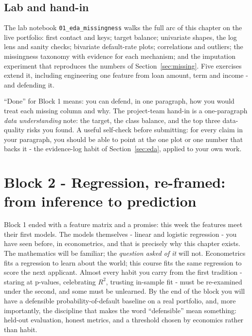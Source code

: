 \documentclass[11pt,a4paper]{article}
\begin{document}
\subsection{Lab and hand-in}
The lab notebook \texttt{01\_eda\_missingness} walks the full arc of this
chapter on the live portfolio: first contact and keys; target balance;
univariate shapes, the log lens and sanity checks; bivariate default-rate
plots; correlations and outliers; the missingness taxonomy with evidence for
each mechanism; and the imputation experiment that reproduces the numbers of
Section~\ref{sec:missing}. Five exercises extend it, including engineering
one feature from loan amount, term and income - and defending it.

``Done'' for Block 1 means: you can defend, in one paragraph, how you would
treat each missing column and why. The project-team hand-in is a
one-paragraph \emph{data understanding} note: the target, the class balance,
and the top three data-quality risks you found. A useful self-check before
submitting: for every claim in your paragraph, you should be able to point
at the one plot or one number that backs it - the evidence-log habit of
Section~\ref{sec:eda}, applied to your own work.

\section{Block 2 - Regression, re-framed: from inference to prediction}

Block 1 ended with a feature matrix and a promise: this week the features
meet their first models. The models themselves - linear and logistic
regression - you have seen before, in econometrics, and that is precisely
why this chapter exists. The mathematics will be familiar; the
\emph{question asked of it} will not. Econometrics fits a regression to
learn about the world; this course fits the same regression to score the
next applicant. Almost every habit you carry from the first tradition -
staring at p-values, celebrating $R^2$, trusting in-sample fit - must be
re-examined under the second, and some must be unlearned. By the end of
the block you will have a defensible probability-of-default baseline on a
real portfolio, and, more importantly, the discipline that makes the word
``defensible'' mean something: held-out evaluation, honest metrics, and a
threshold chosen by economics rather than habit.
\end{document}
